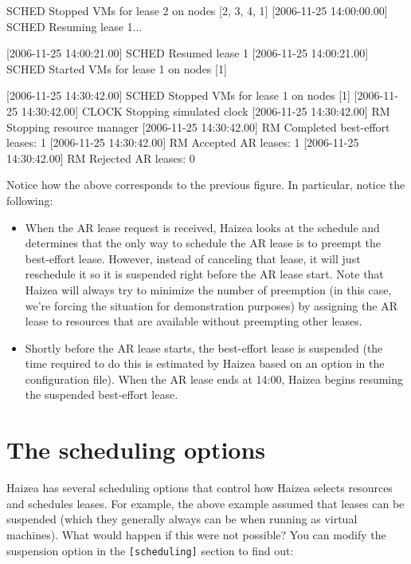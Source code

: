 \begin{wideshellverbatim}
[2006-11-25 14:00:00.00] SCHED   Stopped VMs for lease 2 on nodes [2, 3, 4, 1]
[2006-11-25 14:00:00.00] SCHED   Resuming lease 1...

[2006-11-25 14:00:21.00] SCHED   Resumed lease 1
[2006-11-25 14:00:21.00] SCHED   Started VMs for lease 1 on nodes [1]

[2006-11-25 14:30:42.00] SCHED   Stopped VMs for lease 1 on nodes [1]
[2006-11-25 14:30:42.00] CLOCK   Stopping simulated clock
[2006-11-25 14:30:42.00] RM      Stopping resource manager
[2006-11-25 14:30:42.00] RM        Completed best-effort leases: 1
[2006-11-25 14:30:42.00] RM        Accepted AR leases: 1
[2006-11-25 14:30:42.00] RM        Rejected AR leases: 0
\end{wideshellverbatim}

Notice how the above corresponds to the previous figure. In particular, notice the following:

\begin{itemize}
 \item  When the AR lease request is received, Haizea looks at the schedule and determines that the only way to schedule the AR lease is to preempt the best-effort lease. However, instead of canceling that lease, it will just reschedule it so it is suspended right before the AR lease start. Note that Haizea will always try to minimize the number of preemption (in this case, we're forcing the situation for demonstration purposes) by assigning the AR lease to resources that are available without preempting other leases.
 \item Shortly before the AR lease starts, the best-effort lease is suspended (the time required to do this is estimated by Haizea based on an option in the configuration file). When the AR lease ends at 14:00, Haizea begins resuming the suspended best-effort lease.
\end{itemize}

\section{The scheduling options}

Haizea has several scheduling options that control how Haizea selects resources and schedules leases. For example, the above example assumed that leases can be suspended (which they generally always can be when running as virtual machines). What would happen if this were not possible? You can modify the suspension option in the \texttt{[scheduling]} section to find out:

